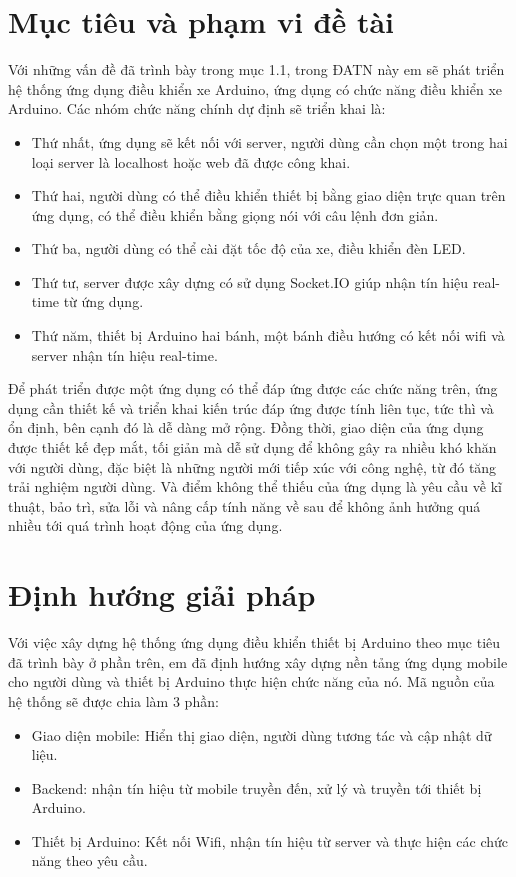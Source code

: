 \documentclass[../DoAn.tex]{subfiles}
\begin{document}
\section{Mục tiêu và phạm vi đề tài}
\label{section:1.2}
Với những vấn đề đã trình bày trong mục 1.1, trong ĐATN này em sẽ phát triển hệ thống ứng dụng điều khiển xe Arduino, ứng dụng có chức năng điều khiển xe Arduino. Các nhóm chức năng chính dự định sẽ triển khai là:
\begin{itemize}
\item Thứ nhất, ứng dụng sẽ kết nối với server, người dùng cần chọn một trong hai loại server là localhost hoặc web đã được công khai.
\item Thứ hai, người dùng có thể điều khiển thiết bị bằng giao diện trực quan trên ứng dụng, có thể điều khiển bằng giọng nói với câu lệnh đơn giản.
\item Thứ ba, người dùng có thể cài đặt tốc độ của xe, điều khiển đèn LED.
\item Thứ tư, server được xây dựng có sử dụng Socket.IO\cite{SocketIO} giúp nhận tín hiệu real-time từ ứng dụng.
\item Thứ năm, thiết bị Arduino hai bánh, một bánh điều hướng có kết nối wifi và server nhận tín hiệu real-time.
\end{itemize}

Để phát triển được một ứng dụng có thể đáp ứng được các chức năng trên, ứng dụng cần thiết kế và triển khai kiến trúc đáp ứng được tính liên tục, tức thì và ổn định, bên cạnh đó là dễ dàng mở rộng. Đồng thời, giao diện của ứng dụng được thiết kế đẹp mắt, tối giản mà dễ sử dụng để không gây ra nhiều khó khăn với người dùng, đặc biệt là những người mới tiếp xúc với công nghệ, từ đó tăng trải nghiệm người dùng. Và điểm không thể thiếu của ứng dụng là yêu cầu về kĩ thuật, bảo trì, sửa lỗi và nâng cấp tính năng về sau để không ảnh hưởng quá nhiều tới quá trình hoạt động của ứng dụng. 


\section{Định hướng giải pháp}
\label{section:1.3}
Với việc xây dựng hệ thống ứng dụng điều khiển thiết bị Arduino theo mục tiêu đã trình bày ở phần trên, em đã định hướng xây dựng nền tảng ứng dụng mobile cho người dùng và thiết bị Arduino thực hiện chức năng của nó.
Mã nguồn của hệ thống sẽ được chia làm 3 phần:
\begin{itemize}
\item Giao diện mobile: Hiển thị giao diện, người dùng tương tác và cập nhật dữ liệu.
\item Backend: nhận tín hiệu từ mobile truyền đến, xử lý và truyền tới thiết bị Arduino.
\item Thiết bị Arduino: Kết nối Wifi, nhận tín hiệu từ server và thực hiện các chức năng theo yêu cầu.
\end{itemize}
\end{document}
